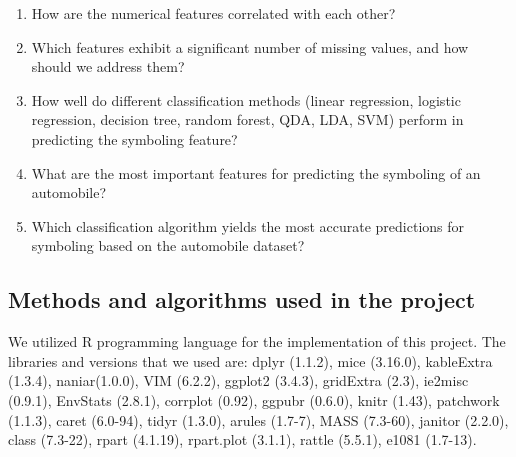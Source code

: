 \documentclass[11pt,a4paper]{article}\usepackage[]{graphicx}\usepackage[]{xcolor}
\begin{document}
\begin{enumerate}
\item How are the numerical features correlated with each other?

\item Which features exhibit a significant number of missing values, and how should we address them?

\item How well do different classification methods (linear regression, logistic regression, decision tree, random forest, QDA, LDA, SVM) perform in predicting the symboling feature?
\item What are the most important features for predicting the symboling of an automobile?



\item Which classification algorithm yields the most accurate predictions for symboling based on the automobile dataset?


\end{enumerate}
	
	\subsection{Methods and algorithms used in the project}
	We utilized R programming language for the implementation of this project. The libraries and versions that we used are: dplyr (1.1.2), mice (3.16.0), kableExtra (1.3.4), naniar(1.0.0), VIM (6.2.2), ggplot2 (3.4.3), gridExtra (2.3), ie2misc (0.9.1), EnvStats (2.8.1), corrplot (0.92), ggpubr (0.6.0), knitr (1.43), patchwork (1.1.3), caret (6.0-94), tidyr (1.3.0), arules (1.7-7), MASS (7.3-60), janitor (2.2.0), class (7.3-22), rpart (4.1.19), rpart.plot (3.1.1), rattle (5.5.1), e1081 (1.7-13).
\end{document}
